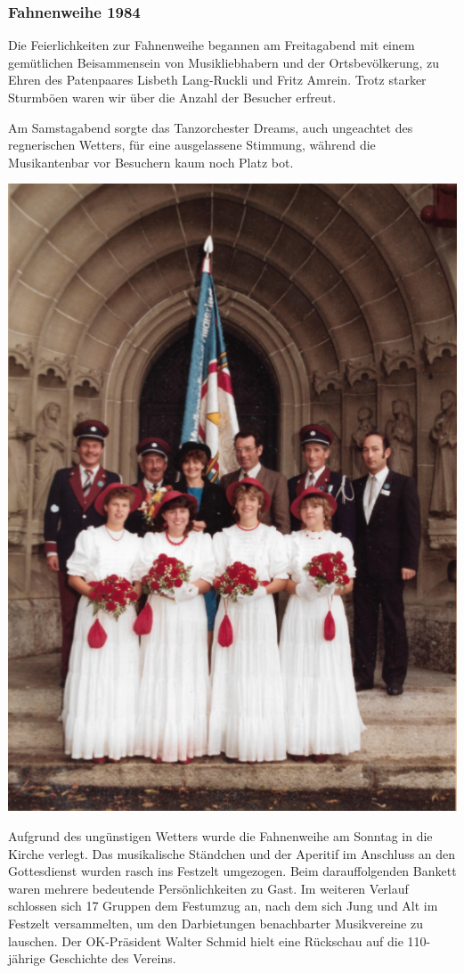 \clearpage
\begin{history}

    \subsubsection{Fahnenweihe 1984}

    Die Feierlichkeiten zur Fahnenweihe begannen am Freitagabend mit einem
    gemütlichen Beisammensein von Musikliebhabern und der Ortsbevölkerung, zu
    Ehren des Patenpaares Lisbeth Lang-Ruckli und Fritz Amrein. Trotz starker
    Sturmböen waren wir über die Anzahl der Besucher erfreut.

    Am Samstagabend sorgte das Tanzorchester Dreams, auch ungeachtet des
    regnerischen Wetters, für eine ausgelassene Stimmung, während die
    Musikantenbar vor Besuchern kaum noch Platz bot.

    \begin{MulticolFigure}
        \centering
        \includegraphics[width=0.6\linewidth]{./chap/1975-2000/1984/Fahnenweihe-1984.pdf}
    \end{MulticolFigure}

    Aufgrund des ungünstigen Wetters wurde die Fahnenweihe am Sonntag in die
    Kirche verlegt. Das musikalische Ständchen und der Aperitif im Anschluss an
    den Gottesdienst wurden rasch ins Festzelt umgezogen. Beim darauffolgenden
    Bankett waren mehrere bedeutende Persönlichkeiten zu Gast. Im weiteren
    Verlauf schlossen sich 17 Gruppen dem Festumzug an, nach dem sich Jung und
    Alt im Festzelt versammelten, um den Darbietungen benachbarter Musikvereine
    zu lauschen. Der OK-Präsident Walter Schmid hielt eine Rückschau auf die
    110-jährige Geschichte des Vereins.


\end{history}
